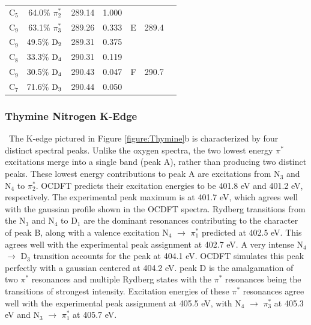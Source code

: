 \documentclass[12pt]{article}
\begin{document}
\begin{table}[!t]
\begin{tabular*}{8.5cm}{@{\extracolsep{\fill} }cccrccc}
    C$_5$
 &   64.0$\%$ $\pi_2^*$  & 289.14 & 1.000 & \multirow{3}{*}{E} & \multirow{3}{*}{289.4} \\
    C$_9$
 &   63.1$\%$ $\pi_3^*$  & 289.26 & 0.333 \\
    C$_9$
 &   49.5$\%$ $\rm D_2$  & 289.31 & 0.375 
 \vspace{0.05in}\\
    C$_8$
 &   33.3$\%$ $\rm D_4$  & 290.31 & 0.119 & \multirow{3}{*}{F} &  \multirow{3}{*}{290.7}  \\
    C$_9$
 &   30.5$\%$ $\rm D_4$  & 290.43 & 0.047 \\
    C$_7$
 &   71.6$\%$ $\rm D_3$  & 290.44 & 0.050 \\
\hline\hline%
   \end{tabular*}
   \label{table: thymine_k_oxygen}
   \end{table}
\subsubsection{Thymine Nitrogen K-Edge} \ The K-edge pictured in Figure \ref{figure:Thymine}b is characterized by four distinct spectral peaks. Unlike the oxygen spectra, the two lowest energy $\pi^*$ excitations merge into a single band (peak A), rather than producing two distinct peaks. These lowest energy contributions to peak A are excitations from N$_3$ and N$_4$ to $\pi^*_2$. OCDFT predicts their excitation energies to be 401.8 eV and 401.2 eV, respectively. The experimental peak maximum is at 401.7 eV, which agrees well with the gaussian profile shown in the OCDFT spectra. Rydberg transitions from the N$_3$ and N$_4$ to D$_1$ are the dominant resonances contributing to the character of peak B, along with a valence excitation N$_4$ $\rightarrow$ $\pi^*_1$ predicted at 402.5 eV. This agrees well with the experimental peak assignment at 402.7 eV. A very intense N$_4$ $\rightarrow$ D$_3$ transition accounts for the peak at 404.1 eV. OCDFT simulates this peak perfectly with a gaussian centered at 404.2 eV. peak D is the amalgamation of two $\pi^*$ resonances and multiple Rydberg states with the $\pi^*$ resonances being the transitions of strongest intensity. Excitation energies of these $\pi^*$ resonances agree well with the experimental peak assignment at 405.5 eV, with N$_4$ $\rightarrow$ $\pi^*_3$ at 405.3 eV and N$_3$ $\rightarrow$ $\pi^*_1$ at 405.7 eV.
\end{document}
